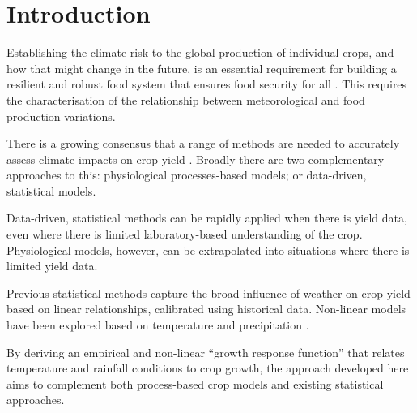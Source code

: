 \documentclass[12pt]{iopart}
\newcommand{\remove}[1]{}
\newcommand{\add}[1]{#1}
\begin{document}
\section{Introduction}

Establishing the climate risk to the global production of individual crops, and how that might change in the future, is an essential requirement for building a resilient and robust food system that ensures food security for all \citep[][]{fao:2002}. %
This requires the characterisation of the relationship between meteorological and food production variations. 

There is a growing consensus that a range of methods are needed to accurately assess climate impacts on crop yield \citep[e.g.][]{lobell:2017, tigchelaar:2018, snyder:2018}.  Broadly there are two complementary approaches to this:  physiological processes-based models; or data-driven, statistical models.

Data-driven, statistical methods can be rapidly applied when there is yield data, even where there is limited laboratory-based understanding of the crop. Physiological models, however, can be extrapolated into situations where there is limited yield data.

Previous statistical methods \citep[e.g.][]{schlenker:2009, lobell:2010, welch:2010} capture the broad influence of weather on crop yield based on linear relationships, calibrated using historical data. Non-linear models have been explored based on temperature \citep[e.g.][]{cutforth:1990, yin:1995, wang:1998, yan:1999, streck:2007, zhou:2018} and precipitation  \citep[e.g.][]{cakir:2004, ge:2012, lobell:2013, carter:2016, song:2019}.

By deriving an empirical \add{and non-linear} ``growth response function'' that \remove{maps}\add{relates} temperature and rainfall conditions to crop growth, the approach developed here aims to complement both process-based crop models and existing statistical approaches. 



\end{document}
